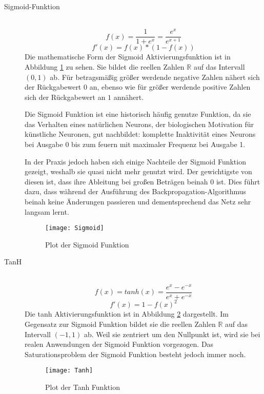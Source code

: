 \begin{description}
	\item[Sigmoid-Funktion] \hfill \\
		\begin{equation}
			f(x) = \frac{1}{1 + e^x} = \frac{e^x}{e^{x + 1}}
			\label{func:Sigmoid}
		\end{equation}
		\begin{equation}
			f'(x) = f(x) * (1 - f(x))
		\end{equation}
		Die mathematische Form der Sigmoid Aktivierungsfunktion ist in Abbildung \ref{sigmoidFunc} zu sehen.
		Sie bildet die reellen Zahlen $\mathbb{R}$ auf das Intervall $(0,1)$ ab. 
		Für betragsmäßig größer werdende negative Zahlen nähert sich der Rückgabewert $0$ an,
		ebenso wie für größer werdende positive Zahlen sich der Rückgabewert an $1$ annähert.

		Die Sigmoid Funktion ist eine historisch häufig genutze Funktion, da sie das Verhalten eines natürlichen Neurons,
		der biologischen Motivation für künstliche Neuronen, gut nachbildet:
		komplette Inaktivität eines Neurons bei Ausgabe 0 bis zum feuern mit maximaler Frequenz bei Ausgabe 1.

		In der Praxis jedoch haben sich einige Nachteile der Sigmoid Funktion gezeigt, weshalb sie quasi nicht mehr genutzt wird.
		Der gewichtigste von diesen ist, dass ihre Ableitung bei großen Beträgen beinah $0$ ist.
		Dies führt dazu, dass während der Ausführung des Backpropagation-Algorithmus beinah keine Änderungen passieren und dementsprechend das Netz sehr langsam lernt.
		
		\begin{figure}
			\centering
			\texttt{[image: Sigmoid]}
			\caption{Plot der Sigmoid Funktion}
			\label{sigmoidFunc}
		\end{figure}
		  


	\item[TanH] \hfill \\
		\begin{equation}
			f(x) = tanh(x) = \frac{e^x - e^{-x}}{e^x + e^{-x}}
		\end{equation}
		\begin{equation}
			f'(x) = 1 - f(x)^2
		\end{equation}
		Die tanh Aktivierungsfunktion ist in Abbildung \ref{tanhfunction} dargestellt.
		Im Gegensatz zur Sigmoid Funktion bildet sie die reellen Zahlen $\mathbb{R}$ auf das Intervall $(-1, 1)$ ab.
		Weil sie zentriert um den Nullpunkt ist, wird sie bei realen Anwendungen der Sigmoid Funktion vorgezogen.
		Das Saturationsproblem der Sigmoid Funktion besteht jedoch immer noch.
		\begin{figure}
			\centering
			\texttt{[image: Tanh]}
			\caption{Plot der Tanh Funktion}
			\label{tanhfunction}
		\end{figure}
	

\end{description}
